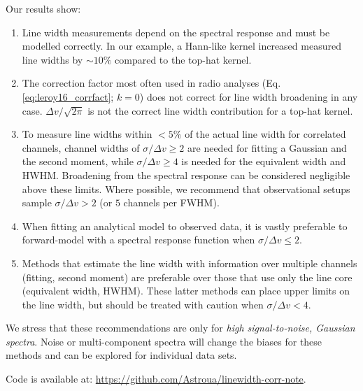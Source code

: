\documentclass{rnaastex}
\begin{document}
Our results show:
\begin{enumerate}
    \item Line width measurements depend on the spectral response and must be modelled correctly. In our example, a Hann-like kernel increased measured line widths by $\sim10\%$ compared to the top-hat kernel.
    \item The correction factor most often used in radio analyses (Eq. \ref{eq:leroy16_corrfact}; $k=0$) does not correct for line width broadening in any case.  $\Delta v / \sqrt{2\pi}$ is not the correct line width contribution for a top-hat kernel.
    \item To measure line widths within $<5\%$ of the actual line width for correlated channels, channel widths of $\sigma / \Delta v \geq 2$ are needed for fitting a Gaussian and the second moment, while $\sigma / \Delta v \geq 4$ is needed for the equivalent width and HWHM. Broadening from the spectral response can be considered negligible above these limits.  Where possible, we recommend that observational setups sample $\sigma / \Delta v > 2$ (or $5$ channels per FWHM).
    \item When fitting an analytical model to observed data, it is vastly preferable to forward-model with a spectral response function when $\sigma / \Delta v \leq 2$.
    \item Methods that estimate the line width with information over multiple channels (fitting, second moment) are preferable over those that use only the line core (equivalent width, HWHM). These latter methods can place upper limits on the line width, but should be treated with caution when $\sigma / \Delta v <4$.
\end{enumerate}

We stress that these recommendations are only for {\it high signal-to-noise, Gaussian spectra}. Noise or multi-component spectra will change the biases for these methods and can be explored for individual data sets.

Code is available at: \url{https://github.com/Astroua/linewidth-corr-note}.
\end{document}
